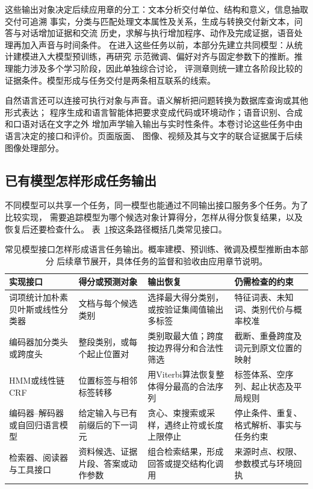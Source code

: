 这些输出对象决定后续应用章的分工：文本分析交付单位、结构和意义，信息抽取交付可追溯
事实，分类与匹配处理文本属性及关系，生成与转换交付新文本，问答与对话增加证据和交流
历史，求解与执行增加程序、动作及完成证据，语音处理再加入声音与时间条件。
在进入这些任务以前，本部分先建立共同模型：从统计建模进入大模型预训练，再研究
示范微调、偏好对齐与固定参数下的推断。推理能力涉及多个学习阶段，因此单独综合讨论，
评测章则统一建立各阶段比较的证据条件。模型形成与任务交付是两条相互联系的线索。

自然语言还可以连接可执行对象与声音。语义解析把问题转换为数据库查询或其他形式表达；
程序生成和语言智能体把要求变成代码或环境动作；语音识别、合成和口语对话在文字之外
增加声学输入输出与实时性条件。本卷讨论这些任务中由语言决定的接口和评价。页面版面、
图像、视频及其与文字的联合证据属于后续图像处理部分。

\subsection{已有模型怎样形成任务输出}
\label{sec:nlp-model-output-interfaces}

不同模型可以共享一个任务，同一模型也能通过不同输出接口服务多个任务。为了比较实现，
需要追踪模型为哪个候选对象计算得分，怎样从得分恢复结果，以及恢复后还要检查什么。
表~\ref{tab:nlp-model-output-interfaces}按这条路径概括几类常见接口。

\begin{table}[htbp]
  \centering
  \begin{tabularx}{\linewidth}{@{}p{31mm}p{35mm}p{42mm}X@{}}
    \toprule
    实现接口 & 得分或预测对象 & 输出恢复 & 仍需检查的约束 \\
    \midrule
    词项统计加朴素贝叶斯或线性分类器
      & 文档与每个候选类别
      & 选择最大得分类别，或按验证集阈值输出多标签
      & 特征词表、未知词、类别代价与概率校准 \\
    编码器加分类头或跨度头
      & 整段类别，或每个起止位置对
      & 类别取最大值；跨度按边界得分和合法性筛选
      & 截断、重叠跨度及词元到原文位置的映射 \\
    HMM或线性链CRF
      & 位置标签与相邻标签转移
      & 用Viterbi算法恢复整体得分最高的合法序列
      & 标签体系、空序列、起止状态及平局规则 \\
    编码器--解码器或自回归语言模型
      & 给定输入与已有前缀后的下一词元
      & 贪心、束搜索或采样，遇终止符或长度上限停止
      & 停止条件、重复、格式解析、事实与任务约束 \\
    检索器、阅读器与工具接口
      & 资料候选、证据片段、答案或动作参数
      & 组合检索结果，形成回答或提交结构化调用
      & 来源时点、权限、参数模式与环境回执 \\
    \bottomrule
  \end{tabularx}
  \caption{常见模型接口怎样形成语言任务输出。概率建模、预训练、微调及模型推断由本部分
  后续章节展开，具体任务的监督和验收由应用章节说明。}
  \label{tab:nlp-model-output-interfaces}
\end{table}

